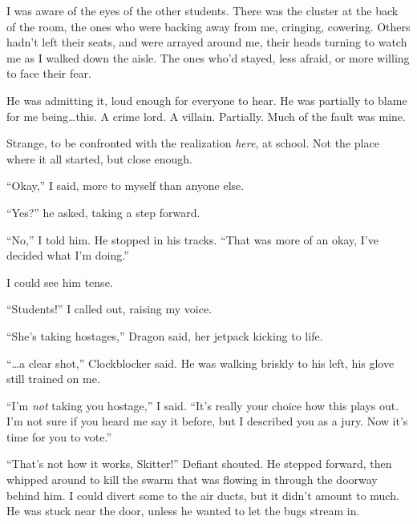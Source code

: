 I was aware of the eyes of the other students.  There was the cluster at the back of the room, the ones who were backing away from me, cringing, cowering.  Others hadn't left their seats, and were arrayed around me, their heads turning to watch me as I walked down the aisle.  The ones who'd stayed, less afraid, or more willing to face their fear.



He was admitting it, loud enough for everyone to hear.  He was partially to blame for me being\ldots this.  A crime lord.  A villain.  Partially.  Much of the fault was mine.



Strange, to be confronted with the realization \emph{here}, at school.  Not the place where it all started, but close enough.



``Okay,'' I said, more to myself than anyone else.



``Yes?'' he asked, taking a step forward.



``No,'' I told him.  He stopped in his tracks.  ``That was more of an okay, I've decided what I'm doing.''



I could see him tense.



``Students!'' I called out, raising my voice.



``She's taking hostages,'' Dragon said, her jetpack kicking to life.



``\ldots{}a clear shot,'' Clockblocker said.  He was walking briskly to his left, his glove still trained on me.



``I'm \emph{not} taking you hostage,'' I said.  ``It's really your choice how this plays out.  I'm not sure if you heard me say it before, but I described you as a jury.  Now it's time for you to vote.''



``That's not how it works, Skitter!'' Defiant shouted.  He stepped forward, then whipped around to kill the swarm that was flowing in through the doorway behind him.  I could divert some to the air ducts, but it didn't amount to much.  He was stuck near the door, unless he wanted to let the bugs stream in.



